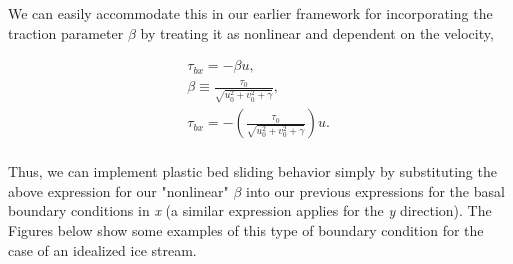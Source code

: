 We can easily accommodate this in our earlier framework for incorporating the traction parameter $\beta$ by treating it as nonlinear and dependent on the velocity,

\begin{align*}
  & \tau _{bx}=-\beta u,\quad \quad  \\ 
 & \beta \equiv \frac{\tau _{0}}{\sqrt{u_{0}^{2}+v_{0}^{2}+\gamma }},\quad  \\ 
 & \tau _{bx}=-\left( \frac{\tau _{0}}{\sqrt{u_{0}^{2}+v_{0}^{2}+\gamma }} \right)u.\quad  \\
\end{align*}

Thus, we can implement plastic bed sliding behavior simply by substituting the above expression for our "nonlinear" \textit{{\large \(\beta{}\)}} into our previous expressions for the basal boundary conditions in \textit{x} (a similar expression applies for the \textit{y} direction). The Figures below show some examples of this type of boundary condition for the case of an idealized ice stream.



